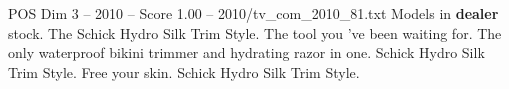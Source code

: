 \begin{textsample}{POS Dim 3 – 2010 – Score 1.00 – 2010/tv\_com\_2010\_81.txt}  \label{ex:f3_pos_050}
Models in \textbf{dealer} stock.
The Schick Hydro Silk Trim Style.
The tool you 've been waiting for.
The only waterproof bikini trimmer and hydrating razor in one.
Schick Hydro Silk Trim Style.
Free your skin.
Schick Hydro Silk Trim Style.

\end{textsample}

